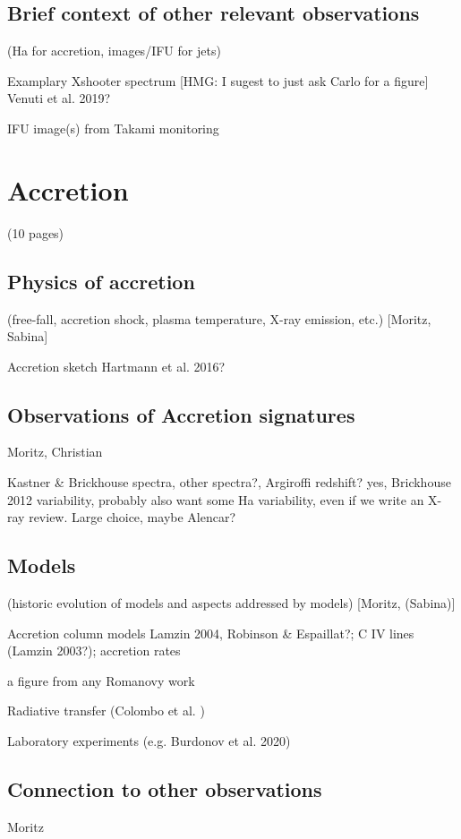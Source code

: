 \documentclass[graybox, nosecnum]{svmult}
\begin{document}
\subsection{Brief context of other relevant observations}
(Ha for accretion, images/IFU for jets)

Examplary Xshooter spectrum [HMG: I sugest to just ask Carlo for a figure] Venuti et al. 2019?

        IFU image(s) from Takami monitoring

\section{Accretion}
(10 pages)
\subsection{Physics of accretion}
(free-fall, accretion shock, plasma temperature, X-ray emission, etc.) [Moritz, Sabina]

Accretion sketch Hartmann et al. 2016?

\subsection{Observations of Accretion signatures}
Moritz, Christian

Kastner & Brickhouse spectra, other spectra?, Argiroffi redshift? yes, Brickhouse 2012 variability, probably also want some Ha variability, even if we write an X-ray review. Large choice, maybe Alencar?

\subsection{Models}
(historic evolution of models and aspects addressed by models) [Moritz, (Sabina)]

Accretion column models Lamzin 2004, Robinson & Espaillat?; C IV lines (Lamzin 2003?); accretion rates

a figure from any Romanovy work


Radiative transfer (Colombo et al. )

Laboratory experiments (e.g. Burdonov et al. 2020)



\subsection{Connection to other observations}
           Moritz
\end{document}
